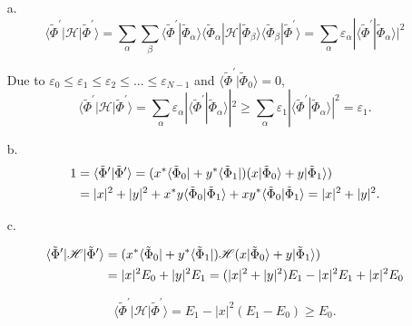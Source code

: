 \documentclass[a4paper]{book}
\begin{document}
	\begin{solution}
	\begin{enumerate}
	\item[a.]
	\begin{equation*}
		\langle \tilde{\Phi}^\prime | \mathscr{H} | \tilde{\Phi}^\prime \rangle = \sum_\alpha \sum_\beta \langle \tilde{\Phi}^\prime | \tilde{\Phi}_\alpha \rangle \langle \tilde{\Phi}_\alpha |\mathscr{H} | \tilde{\Phi}_\beta \rangle \langle \tilde{\Phi}_\beta | \tilde{\Phi}^\prime \rangle = \sum_\alpha \varepsilon_\alpha | \langle \tilde{\Phi}^\prime | \tilde{\Phi}_\alpha \rangle |^2
	\end{equation*}
	
	Due to $\varepsilon_0 \leqslant \varepsilon_1 \leqslant \varepsilon_2 \leqslant ... \leqslant \varepsilon_{N - 1}$ and $\langle \tilde{\Phi}^\prime | \tilde{\Phi}_0 \rangle = 0$,
	\begin{equation}
		\langle \tilde{\Phi}^\prime | \mathscr{H} | \tilde{\Phi}^\prime \rangle = \sum_\alpha \varepsilon_\alpha | \langle \tilde{\Phi}^\prime | \tilde{\Phi}_\alpha \rangle |^2 \geqslant \sum_\alpha \varepsilon_1 | \langle \tilde{\Phi}^\prime | \tilde{\Phi}_\alpha \rangle |^2 = \varepsilon_1.
	\end{equation}
			
	\item[b.]
	\begin{align}
		1 &= \langle \tilde{\Phi}^\prime | \tilde{\Phi}^\prime \rangle = ( x^* \langle \tilde{\Phi}_0 | + y^* \langle \tilde{\Phi}_1 | ) ( x | \tilde{\Phi}_0 \rangle + y | \tilde{\Phi}_1 \rangle ) \notag \\
		&= |x|^2 + |y|^2 + x^*y \langle \tilde{\Phi}_0 | \tilde{\Phi}_1 \rangle +  xy^* \langle \tilde{\Phi}_0 | \tilde{\Phi}_1 \rangle = |x|^2 + |y|^2.
	\end{align}
				
	\item[c.]
	
	\begin{align*}
		\langle \tilde{\Phi}^\prime | \mathscr{H} | \tilde{\Phi}^\prime \rangle &= ( x^* \langle \tilde{\Phi}_0 | + y^* \langle \tilde{\Phi}_1 | ) \mathscr{H} ( x | \tilde{\Phi}_0 \rangle + y | \tilde{\Phi}_1 \rangle ) \notag \\
		&= |x|^2 E_0 + |y|^2 E_1 = ( |x|^2 + |y|^2 ) E_1 - |x|^2 E_1 + |x|^2 E_0
	\end{align*}
				
	\begin{equation}
		\langle \tilde{\Phi}^\prime | \mathscr{H} | \tilde{\Phi}^\prime \rangle = E_1 - |x|^2 ( E_1 - E_0 ) \geqslant E_0. 
	\end{equation}
	
	\end{enumerate}
			
	\end{solution}
	
\end{document}
